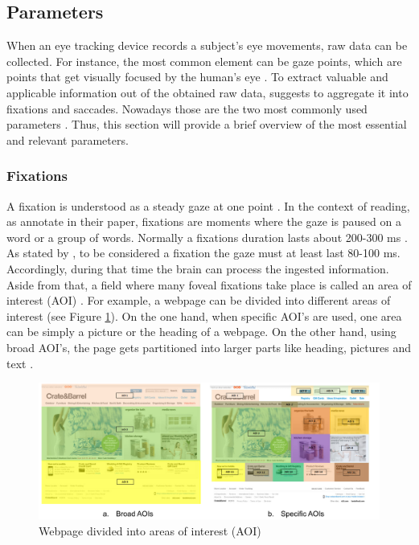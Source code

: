 \subsection{Parameters}
\label{subsection:Parameters}
When an eye tracking device records a subject's eye movements, raw data can be collected. For instance, the most common element can be gaze points, which are points that get visually focused by the human's eye \autocite{bojko2009informative, vspakov2007visualization}. To extract valuable and applicable information out of the obtained raw data, \textcite[]{blascheck2014state}  suggests to aggregate it into fixations and saccades. 
Nowadays those are the two most commonly used parameters \autocite{bruneau2002eyes}. Thus, this section will provide a brief overview of the most essential and relevant parameters.

\subsubsection{Fixations}
A fixation is understood as a steady gaze at one point \autocite[]{buscher2009you}.  In the context of reading, as \textcite[]{beymer2007eye} annotate in their paper, fixations are moments where the gaze is paused on a word or a group of words. 
Normally a fixations duration lasts about 200-300 ms \autocite[]{kasneci2015online}. As stated by \textcite[]{buscher2009you}, to be considered a fixation the gaze must at least last 80-100 ms. Accordingly, during that time the brain can process the ingested information. Aside from that, a field where many foveal fixations take place is called an area of interest (AOI) \autocite[]{djamasbi2014eye}. For example, a webpage can be divided into different areas of interest (see Figure \ref{figure:AOI}).  On the one hand, when specific AOI's are used, one area can be simply a picture or the heading of a webpage. On the other hand, using broad AOI's, the page gets partitioned into larger parts like heading, pictures and text \autocite{djamasbi2014eye}. \\

\begin{figure}[t]
    \centering
    \includegraphics[width=0.75\linewidth]{images/AOI_djamasbi2014eye.png}
    \caption{
        Webpage divided into areas of interest (AOI) \autocite[48]{djamasbi2014eye}
    }
    \label{figure:AOI}
\end{figure}

